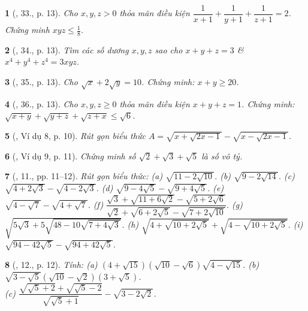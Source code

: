 \documentclass{article}
\newtheorem{baitoan}{}
\begin{document}
\begin{baitoan}[\cite{Tuyen_Toan_9_old}, 33., p. 13]
	Cho $x,y,z > 0$ thỏa mãn điều kiện $\dfrac{1}{x + 1} + \dfrac{1}{y + 1} + \dfrac{1}{z + 1} = 2$. Chứng minh $xyz\le\frac{1}{8}$.
\end{baitoan}

\begin{baitoan}[\cite{Tuyen_Toan_9_old}, 34., p. 13]
	Tìm các số dương $x,y,z$ sao cho $x + y + z = 3$ \& $x^4 + y^4 + z^4 = 3xyz$.
\end{baitoan}

\begin{baitoan}[\cite{Tuyen_Toan_9_old}, 35., p. 13]
	Cho $\sqrt{x} + 2\sqrt{y} = 10$. Chứng minh: $x + y\ge20$.
\end{baitoan}

\begin{baitoan}[\cite{Tuyen_Toan_9_old}, 36., p. 13]
	Cho $x,y,z\ge0$ thỏa mãn điều kiện $x + y + z = 1$. Chứng minh: $\sqrt{x + y} + \sqrt{y + z} + \sqrt{z + x}\le\sqrt{6}$.
\end{baitoan}

\begin{baitoan}[\cite{Binh_Toan_9_tap_1}, Ví dụ 8, p. 10]
	Rút gọn biểu thức $A = \sqrt{x + \sqrt{2x - 1}} - \sqrt{ x - \sqrt{2x - 1}}$.
\end{baitoan}

\begin{baitoan}[\cite{Binh_Toan_9_tap_1}, Ví dụ 9, p. 11]
	Chứng minh số $\sqrt{2} + \sqrt{3} + \sqrt{5}$ là số vô tỷ.
\end{baitoan}

\begin{baitoan}[\cite{Binh_Toan_9_tap_1}, 11., pp. 11--12]
	Rút gọn biểu thức: (a) $\sqrt{11 - 2\sqrt{10}}$. (b) $\sqrt{9 - 2\sqrt{14}}$. (c) $\sqrt{4 + 2\sqrt{3}} - \sqrt{4 - 2\sqrt{3}}$. (d) $\sqrt{9 - 4\sqrt{5}} - \sqrt{9 + 4\sqrt{5}}$. (e) $\sqrt{4 - \sqrt{7}} - \sqrt{4 + \sqrt{7}}$. (f) $\dfrac{\sqrt{3} + \sqrt{11 + 6\sqrt{2}}- \sqrt{5 + 2\sqrt{6}}}{\sqrt{2} + \sqrt{6 + 2\sqrt{5}} - \sqrt{7 + 2\sqrt{10}}}$. (g) $\sqrt{5\sqrt{3} + 5\sqrt{48 - 10\sqrt{7+ 4\sqrt{3}}}}$. (h) $\sqrt{4 + \sqrt{10 + 2\sqrt{5}}} + \sqrt{4 - \sqrt{10 + 2\sqrt{5}}}$. (i) $\sqrt{94 - 42\sqrt{5}} - \sqrt{94 + 42\sqrt{5}}$.
\end{baitoan}

\begin{baitoan}[\cite{Binh_Toan_9_tap_1}, 12., p. 12]
	Tính: (a) $(4 + \sqrt{15})(\sqrt{10} - \sqrt{6})\sqrt{4 - \sqrt{15}}$. (b) $\sqrt{3 - \sqrt{5}}(\sqrt{10} - \sqrt{2})(3 + \sqrt{5})$.\\(c) $\dfrac{\sqrt{\sqrt{5} + 2} + \sqrt{\sqrt{5} - 2}}{\sqrt{\sqrt{5} + 1}} - \sqrt{3 - 2\sqrt{2}}$.
\end{baitoan}
\end{document}
